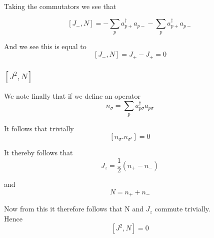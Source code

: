 \documentclass[11pt]{article} %
\begin{document}
Taking the commutators we see that\

\begin{equation}
\left[J_-,N\right]=-\sum_p a_{p+}^\dagger a_{p-} -\sum_p a_{p+}^\dagger a_{p-}
\end{equation}

And we see this is equal to\\
\begin{equation}
\left[J_-,N\right]=J_+ -J_+=0
\end{equation}

\subsubsection{$\left[J^2,N\right]$}

We note finally that if we define an operator 
\begin{equation}n_{\sigma}=\sum_p a_{p\sigma}^\dagger a_{p\sigma}\end{equation}

It follows that trivially \\

\begin{equation}
\left[n_{\sigma}.n_{\sigma'}\right]=0
\end{equation}

It thereby follows that \\

\begin{equation}
J_z=\frac{1}{2}\left(n_+ - n_-\right)
\end{equation}

and\\

\begin{equation}
N=n_++n_-
\end{equation}

Now from this it therefore follows that N and $J_z$ commute trivially.\\

Hence \\

\begin{equation}
\left[J^2,N\right]=0
\end{equation}
\end{document}
